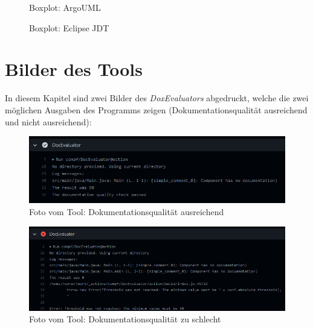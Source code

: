 \begin{appendices}
\begin{figure}[ht!]
\end{figure}
\hfill
 \begin{figure}
    \centering

    \caption{Boxplot: ArgoUML}
  
\end{figure}

 \begin{figure}
    \centering

    \caption{Boxplot: Eclipse \ac{JDT} }
  
\end{figure}
\chapter{Bilder des Tools}\label{chapter:pictures_tool}
In diesem Kapitel sind zwei Bilder des \textit{DoxEvaluators} abgedruckt, welche die zwei möglichen Ausgaben des Programms zeigen (Dokumentationsqualität ausreichend und nicht ausreichend):
\begin{figure}[htbp!]
    \centering
    \includegraphics[width=\columnwidth]{figures/appendix/passed.png}
    \caption{Foto vom Tool: Dokumentationsqualität ausreichend}
    \label{fig:passed}
\end{figure}
\begin{figure}[htbp!]
    \centering
    \includegraphics[width=\columnwidth]{figures/appendix/absolute_threshold.png}
    \caption{Foto vom Tool: Dokumentationsqualität zu schlecht}
    \label{fig:absolute}
\end{figure}

\end{appendices}
	
